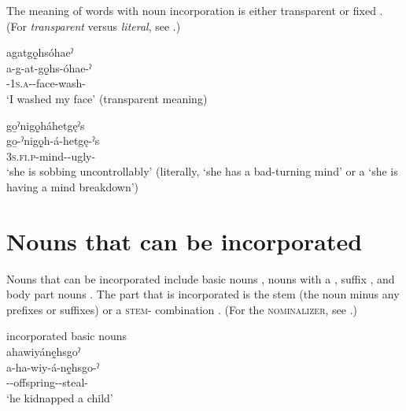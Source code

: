 The meaning of words with noun incorporation is either transparent  or fixed . (For \textit{transparent} versus \textit{literal}, see .)

\ea\label{ex:nounincex2}
\ea agatgǫ̱hsóhaeˀ \\\label{ex:nounincex2a}
\gll a-g-at-gǫ̱hs-óhae-ˀ\\
{\factual}-\textsc{1s.a}-{\semireflexive}-face-wash-{\punctual}\\
\glt ‘I washed my face’ (transparent meaning)

\ex go̱ˀnigǫ̱háhetgęˀs\\\label{ex:nounincex2b}
\gll go̱-ˀnigǫ̱h-á-hetgę-ˀs\\
\textsc{3s.fi.p}-mind-{\joinerA}-ugly-{\habitual}\\
\glt ‘she is sobbing uncontrollably’ (literally, ‘she has a bad-turning mind’ or a ‘she is having a mind breakdown’)

\z
\z



\section{Nouns that can be incorporated} \label{ch:Nouns that can be incorporated}
Nouns that can be incorporated include basic nouns , nouns with a  ,  {\nominalizer} suffix , and body part nouns . The part that is incorporated is the stem (the noun minus any prefixes or suffixes) or a \textsc{stem-\nominalizer} combination . (For the \textsc{nominalizer}, see .)

\ea\label{ex:nounincex4} incorporated basic nouns\\
ahawiyánę̱hsgoˀ\\
\gll a-ha-wiy-á-nę̱hsgo-ˀ\\
 {\factual}--offspring-{\joinerA}-steal-{\punctual}\\
\glt `he kidnapped a child'
\z

